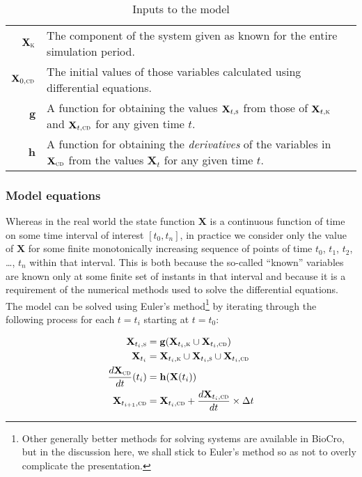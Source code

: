 \documentclass{article}
\makeatletter
\newenvironment{descriptions}
  {\par\vspace{\abovedisplayskip}\begin{tabular}{>{$}r<{$} @{$:{}$} p{40em}}}
  {\end{tabular}\par\vspace{\belowdisplayskip}}
\newcommand{\boldX}{\mathbf{X}}
\newcommand{\cd}{\textsc{cd}}
\newcommand{\kn}{\textsc{k}} %
\newcommand{\s}{\textsc{s}} %
\newcommand{\g}{\mathbf{g}}
\newcommand{\h}{\mathbf{h}}
\makeatother
\begin{document}
\begin{table}[!htbp]
  \begin{center}
    \begin{descriptions}

	  \boldX_\kn & The component of the system given as known for the
      entire simulation period. \\

	  \boldX_{0,\cd} & The initial values of those variables
      calculated using differential equations. \\

	  \g & A function for obtaining the values $\boldX_{t,\s}$ from
      those of $\boldX_{t,\kn}$ and $\boldX_{t,\cd}$ for any given
      time $t$. \\

	  \h & A function for obtaining the \emph{derivatives} of the
      variables in $\boldX_\cd$ from the values $\boldX_t$ for any
      given time $t$.

    \end{descriptions}
    \caption{\label{tab:model_inputs}Inputs to the model}
  \end{center}
\end{table}



\subsubsection{Model equations}
\label{sec:model_equations}
Whereas in the real world the state function $\boldX$ is a continuous
function of time on some time interval of interest $[t_0, t_n]$, in
practice we consider only the value of $\boldX$ for some finite
monotonically increasing sequence of points of time $t_0$, $t_1$,
$t_2$, \dots, $t_n$ within that interval.  This is both because the
so-called ``known'' variables are known only at some finite set of
instants in that interval and because it is a requirement of the
numerical methods used to solve the differential equations. The model
can be solved using Euler's method\footnote{Other generally better
  methods for solving systems are available in BioCro, but in the
  discussion here, we shall stick to Euler's method so as not to
  overly complicate the presentation.}  by iterating through the
following process for each $t=t_i$ starting at $t = t_0$:

\begin{align}
  \label{eq:solver_loop}
  \begin{split}
	\boldX_{t_i,\s} &= \g(\boldX_{t_i,\kn} \cup \boldX_{t_i,\cd}) \\
    \boldX_{t_i} &= \boldX_{t_i,\kn}  \cup \boldX_{t_i,\s} \cup \boldX_{t_i,\cd} \\
    \frac{d\boldX_\cd}{dt}(t_i) &= \h(\boldX(t_i))  \\
    \boldX_{t_{i+1},\cd} &= \boldX_{t_i,\cd} + \frac{d\boldX_{t_i,\cd}}{dt} \times \Delta t
  \end{split}
\end{align}
\end{document}
